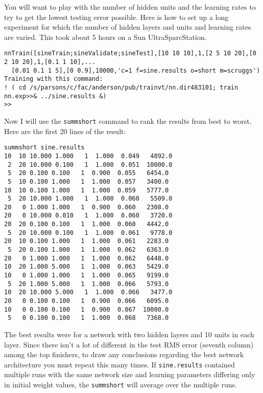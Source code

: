 You will want to  play with the number of hidden units
and the learning rates to try to get the lowest testing error
possible.  Here is how to set up a long experiment for which the number of
hidden layers and units and learning rates are varied.  This took about 5
hours on a Sun UltraSparcStation. 
\begin{small}

\begin{verbatim}
nnTrain([sineTrain;sineValidate;sineTest],[10 10 10],1,[2 5 10 20],[0 2 10 20],1,[0.1 1 10],...
  [0.01 0.1 1 5],[0 0.9],10000,'c=1 f=sine.results o=short m=scruggs')
Training with this command:
! ( cd /s/parsons/c/fac/anderson/pub/trainvt/nn.dir483101; train nn.exp>>& ../sine.results &)
>> 
\end{verbatim}
\end{small}
Now I will use the \verb'summshort' command to rank the results from best to
worst.  Here are the first 20 lines of the result:
\begin{small}
\begin{verbatim} 
summshort sine.results
10  10 10.000 1.000   1  1.000  0.049   4892.0
 2  20 10.000 0.100   1  1.000  0.051  10000.0
 5  20 0.100 0.100   1  0.900  0.055   6454.0
 5  10 0.100 1.000   1  1.000  0.057   3400.0
10  10 0.100 1.000   1  1.000  0.059   5777.0
 5  20 10.000 1.000   1  1.000  0.060   5509.0
20   0 1.000 1.000   1  0.900  0.060   2308.0
20   0 10.000 0.010   1  1.000  0.060   3720.0
20  20 0.100 0.100   1  1.000  0.060   4442.0
 5  20 10.000 0.100   1  1.000  0.061   9778.0
20  10 0.100 1.000   1  1.000  0.061   2283.0
 5  20 0.100 1.000   1  1.000  0.062   6363.0
20   0 1.000 1.000   1  1.000  0.062   6448.0
10  20 1.000 5.000   1  1.000  0.063   5429.0
10   0 1.000 1.000   1  1.000  0.065   9199.0
 5  20 1.000 5.000   1  1.000  0.066   5793.0
10  20 10.000 5.000   1  1.000  0.066   3477.0
20   0 0.100 0.100   1  0.900  0.066   6095.0
10   0 0.100 0.100   1  0.900  0.067  10000.0
 5   0 0.100 0.100   1  1.000  0.068   7368.0
\end{verbatim}
\end{small}
The best results were for a network with two hidden layers and 10 units in
each layer.  Since there isn't a lot of different in the test RMS error
(seventh column) among the top finishers, to draw any conclusions regarding
the best network architecture you must repeat this many times.  If
\verb'sine.results' contained multiple runs with the same network size and
learning parameters differing only in initial weight values, the
\verb'summshort' will average over the multiple runs.


